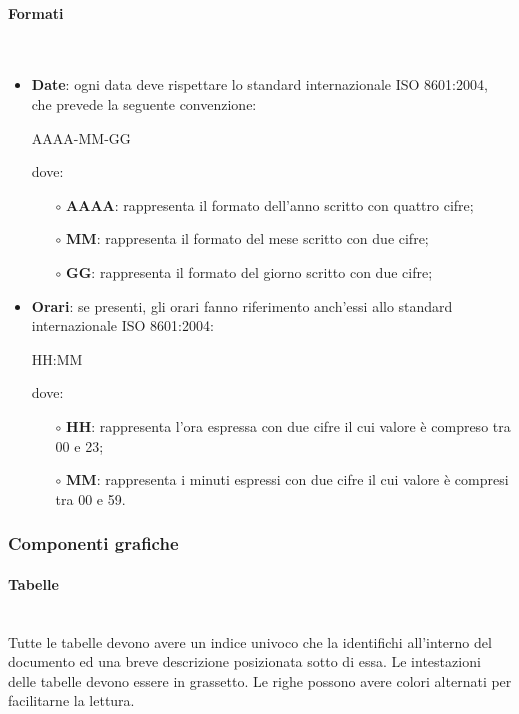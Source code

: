 \paragraph{Formati}\mbox{}\\ \label{sec:Formati}
\begin{itemize}
	\item \textbf{Date}: ogni data deve rispettare lo standard internazionale ISO 8601:2004, che prevede la seguente convenzione:
	\begin{center}
	AAAA-MM-GG
	\end{center}
	dove: 
	\begin{itemize}
		\item[$\circ$] \textbf{AAAA}: rappresenta il formato dell'anno scritto con quattro cifre;
		\item[$\circ$] \textbf{MM}: rappresenta il formato del mese scritto con due cifre;
		\item[$\circ$] \textbf{GG}: rappresenta il formato del giorno scritto con due cifre;
		\end{itemize}
		\item \textbf{Orari}: se presenti, gli orari fanno riferimento anch'essi allo standard internazionale ISO 8601:2004:
		\begin{center}
		HH:MM
		\end{center}
		dove:
		\begin{itemize}
		\item[$\circ$] \textbf{HH}: rappresenta l'ora espressa con due cifre il cui valore è compreso tra 00 e 23;
		\item[$\circ$] \textbf{MM}: rappresenta i minuti espressi con due cifre il cui valore è compresi tra 00 e 59.
	\end{itemize}
\end{itemize}

\subsubsection{Componenti grafiche}

\paragraph{Tabelle}\mbox{}\\
Tutte le tabelle devono avere un indice univoco che la identifichi all’interno del documento ed una breve descrizione posizionata sotto di essa. Le intestazioni delle tabelle devono essere in grassetto.
Le righe possono avere colori alternati per facilitarne la lettura.
